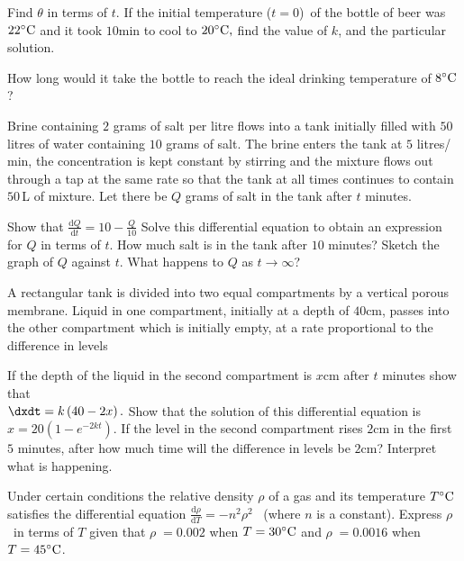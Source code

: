 \begin{Exercise}[title={Separable Equations},label=exSepEqns]
\begin{tasks}
	\task Find $\theta $ in terms of $t$.  If the initial temperature ($t =0$)\ of the bottle of beer was $22 \mbox{{\ensuremath{{}^\circ}}C}$ and it took $10 \mbox{min}$ to cool to $20 \mbox{{\ensuremath{{}^\circ}}C}\text{,}$ find the value of $k$, and the particular solution. 
	
	\task How long would it take the bottle to
	reach the ideal drinking temperature of $8 \mbox{{\ensuremath{{}^\circ}}C}$? \end{tasks}
\Question Brine containing $2$ grams of salt per litre flows into a tank initially filled with $50$ litres of water containing $10$ grams of salt.  The brine enters the tank at $5$ litres/$\mbox{min}$, the concentration is kept constant by stirring and the mixture flows out through a tap at the same rate so that the tank at all times continues to contain $50\,$L of mixture.  Let there be $Q$ grams of salt in the tank after $t$ minutes. 

\begin{tasks}
	\task Show that $\frac{\mathrm{d} Q}{\mathrm{d} t} =10 -\frac{Q}{10}$ 
	\task Solve this differential equation to obtain an expression for $Q$ in terms of $t$. 
	\task How much salt is in the tank after $10$ minutes? 
	\task Sketch the graph of $Q$ against $t$. 
	\task What happens to $Q$ as $t \rightarrow \infty $? \end{tasks}

\Question A rectangular tank is divided into two equal compartments by a vertical porous membrane.  Liquid in one compartment, initially at a depth of $40 \mbox{cm}$, passes into the other compartment which is initially empty, at a rate proportional to the difference in levels 

\begin{tasks}
	\task If the depth of the liquid in the second compartment is $x \mbox{cm}$ after $t$ minutes show that  \\\relax $\dxdt =k \left (40 -2 x\right )\text{.}$ 
	\task Show that the solution of this differential equation is $x =20 \left (1 -e^{ -2 k t}\right )\text{.}$ 
	\task If the level in the second compartment rises $2 \mbox{cm}$ in the first $5$ minutes, after how much time will the difference in levels be $2 \mbox{cm}$? 
	\task Interpret what is happening. \end{tasks}
\Question Under certain conditions the relative density $\rho $ of a gas and its temperature $T \mbox{{\ensuremath{{}^\circ}}C}$ satisfies the differential equation $\frac{\mathrm{d} \rho }{\mathrm{d} T} = -n^{2} \rho ^{2}$  \ (where $n$ is a constant).  Express $\rho $\ in terms of $T$ given that $\rho \; =0.002$ when $T =30 \mbox{{\ensuremath{{}^\circ}}C}$ and $\rho \; =0.0016$ when $T =45 \mbox{{\ensuremath{{}^\circ}}C}$. 

\end{Exercise}
